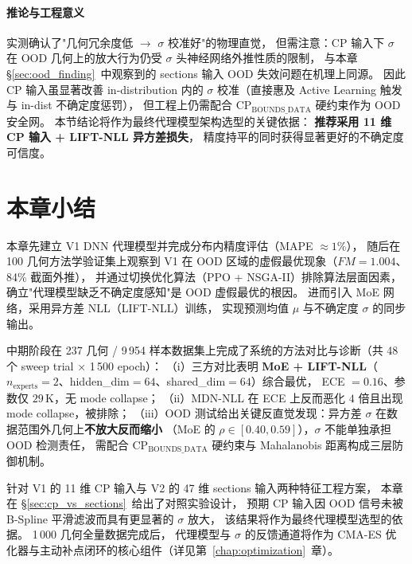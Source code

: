 \paragraph{推论与工程意义}
实测确认了"几何冗余度低 $\to$ $\sigma$ 校准好"的物理直觉，
但需注意：CP 输入下 $\sigma$ 在 OOD 几何上的放大行为仍受 $\sigma$ 头神经网络外推性质的限制，
与本章 \S\ref{sec:ood_finding}~中观察到的 sections 输入 OOD 失效问题在机理上同源。
因此 CP 输入虽显著改善 in-distribution 内的 $\sigma$ 校准（直接惠及 Active Learning 触发与 in-dist 不确定度惩罚），
但工程上仍需配合 $\text{CP}_\text{BOUNDS\_DATA}$ 硬约束作为 OOD 安全网。
本节结论将作为最终代理模型架构选型的关键依据：
\textbf{推荐采用 11 维 CP 输入 + LIFT-NLL 异方差损失}，
精度持平的同时获得显著更好的不确定度可信度。

\section{本章小结}

本章先建立 V1 DNN 代理模型并完成分布内精度评估（MAPE $\approx 1\%$），
随后在 100 几何方法学验证集上观察到 V1 在 OOD 区域的虚假最优现象（$FM = 1.004$、84\% 截面外推），
并通过切换优化算法（PPO + NSGA-II）排除算法层面因素，
确立"代理模型缺乏不确定度感知"是 OOD 虚假最优的根因。
进而引入 MoE 网络，采用异方差 NLL（LIFT-NLL）训练，
实现预测均值 $\mu$ 与不确定度 $\sigma$ 的同步输出。

中期阶段在 237 几何 / 9\,954 样本数据集上完成了系统的方法对比与诊断（共 48 个 sweep trial $\times$ 1\,500 epoch）：
（i）三方对比表明 \textbf{MoE + LIFT-NLL}（$n_\text{experts}{=}2$、hidden\_dim${=}64$、shared\_dim${=}64$）综合最优，
ECE $= 0.16$、参数仅 $29$\,K，无 mode collapse；
（ii）MDN-NLL 在 ECE 上反而恶化 $4$ 倍且出现 mode collapse，被排除；
（iii）OOD 测试给出关键反直觉发现：异方差 $\sigma$ 在数据范围外几何上\textbf{不放大反而缩小}
（MoE 的 $\rho \in [0.40, 0.59]$），$\sigma$ 不能单独承担 OOD 检测责任，
需配合 $\text{CP}_\text{BOUNDS\_DATA}$ 硬约束与 Mahalanobis 距离构成三层防御机制。

针对 V1 的 11 维 CP 输入与 V2 的 47 维 sections 输入两种特征工程方案，
本章在 \S\ref{sec:cp_vs_sections}~给出了对照实验设计，
预期 CP 输入因 OOD 信号未被 B-Spline 平滑滤波而具有更显著的 $\sigma$ 放大，
该结果将作为最终代理模型选型的依据。
1\,000 几何全量数据完成后，
代理模型与 $\sigma$ 的反馈通道将作为 CMA-ES 优化器与主动补点闭环的核心组件（详见第~\ref{chap:optimization}~章）。
